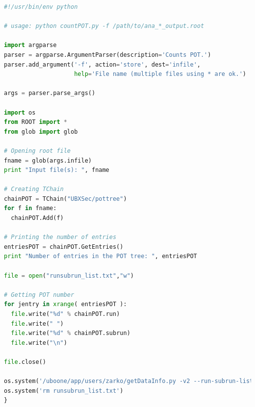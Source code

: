\documentclass[a4paper, oneside, 12pt, onecolumn]{article}
\begin{document}
\begin{mdframed}[style=exampledefault]%
\begin{lstlisting}[label=some-code, language=Python]
#!/usr/bin/env python

# usage: python countPOT.py -f /path/to/ana_*_output.root

import argparse
parser = argparse.ArgumentParser(description='Counts POT.')
parser.add_argument('-f', action='store', dest='infile',
                    help='File name (multiple files using * are ok.')

args = parser.parse_args()

import os
from ROOT import *
from glob import glob

# Opening root file
fname = glob(args.infile)
print "Input file(s): ", fname

# Creating TChain
chainPOT = TChain("UBXSec/pottree")
for f in fname: 
  chainPOT.Add(f)
           
# Printing the number of entries
entriesPOT = chainPOT.GetEntries()
print "Number of entries in the POT tree: ", entriesPOT

file = open("runsubrun_list.txt","w") 

# Getting POT number
for jentry in xrange( entriesPOT ):
  file.write("%d" % chainPOT.run)
  file.write(" ")
  file.write("%d" % chainPOT.subrun)
  file.write("\n")

file.close()

os.system('/uboone/app/users/zarko/getDataInfo.py -v2 --run-subrun-list runsubrun_list.txt')
os.system('rm runsubrun_list.txt')
}
\end{lstlisting}
\end{mdframed} 



\renewcommand*{\bibfont}{\footnotesize}
\printbibliography

\end{document}
